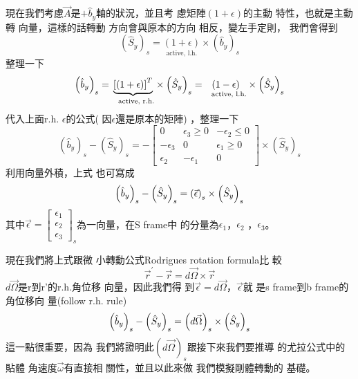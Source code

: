 \documentclass[12pt,a4paper]{article}
\begin{document}
\bigskip 現在我們考慮$\vec{A}$是$+%
\hat{b}_{y}$軸的狀況，並且考%
慮矩陣$\left( 1+\epsilon \right) $的主動%
特性，也就是主動轉%
向量，這樣的話轉動%
方向會與原本的方向%
相反，變左手定則，%
我們會得到%
\begin{equation*}
\left( \hat{S}_{y}\right) _{s}=\underset{\text{active, l.h.}}{\left(
1+\epsilon \right) }\times \left( \hat{b}_{y}\right) _{s}
\end{equation*}%
整理一下%
\begin{equation*}
\left( \hat{b}_{y}\right) _{s}=\underset{\text{active, r.h.}}{\underbrace{%
\left[ \left( 1+\epsilon \right) \right] ^{T}}}\times \left( \hat{S}%
_{y}\right) _{s}=\underset{\text{active, l.h.}}{\left( 1-\epsilon \right) }%
\times \left( \hat{S}_{y}\right) _{s}
\end{equation*}%
代入上面r.h. $\epsilon $的公式(%
因$\epsilon $還是原本的矩陣)%
，整理一下%
\begin{equation*}
\left( \hat{b}_{y}\right) _{s}-\left( \hat{S}_{y}\right) _{s}=-\left[ 
\begin{array}{ccc}
0 & \epsilon _{3}\geq 0 & -\epsilon _{2}\leq 0 \\ 
-\epsilon _{3} & 0 & \epsilon _{1}\geq 0 \\ 
\epsilon _{2} & -\epsilon _{1} & 0%
\end{array}%
\right] \times \left( \hat{S}_{y}\right) _{s}
\end{equation*}%
利用向量外積，上式%
也可寫成%
\begin{equation*}
\left( \hat{b}_{y}\right) _{s}-\left( \hat{S}_{y}\right) _{s}=\left( \vec{%
\epsilon}\right) _{s}\times \left( \hat{S}_{y}\right) _{s}
\end{equation*}%
其中$\vec{\epsilon}=\left[ 
\begin{array}{c}
\epsilon _{1} \\ 
\epsilon _{2} \\ 
\epsilon _{3}%
\end{array}%
\right] _{s}$為一向量，在S frame中%
的分量為$\epsilon _{1}$，$\epsilon _{2}$%
，$\epsilon _{3}$。

現在我們將上式跟微%
小轉動公式Rodrigues rotation formula比%
較%
\begin{equation*}
\vec{r}^{\prime }-\vec{r}=d\vec{\Omega}\times \vec{r}
\end{equation*}%
$d\vec{\Omega}$是r到r'的r.h.角位移%
向量\thinspace ，因此我們得%
到$\vec{\epsilon}=d\vec{\Omega}$，$\vec{\epsilon}$就%
是s frame到b frame的角位移向%
量(follow r.h. rule)%
\begin{equation*}
\left( \hat{b}_{y}\right) _{s}-\left( \hat{S}_{y}\right) _{s}=\left( d\vec{%
\Omega}\right) _{s}\times \left( \hat{S}_{y}\right) _{s}
\end{equation*}%
這一點很重要，因為%
我們將證明此$\left( d\vec{\Omega}\right)
_{s}$跟接下來我們要推導%
的尤拉公式中的貼體%
角速度$\vec{\omega}$有直接相%
關性，並且以此來做%
我們模擬剛體轉動的%
基礎。
\end{document}
